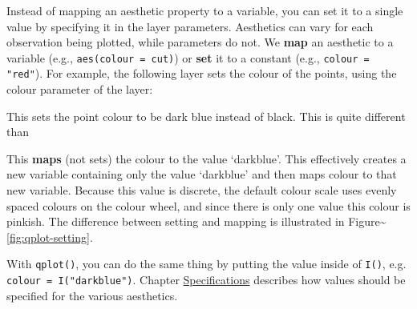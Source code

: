 
Instead of mapping an aesthetic property to a variable, you can set it
to a single value by specifying it in the layer parameters. Aesthetics
can vary for each observation being plotted, while parameters do not. We
\textbf{map} an aesthetic to a variable (e.g.,
\texttt{aes(colour = cut)}) or \textbf{set} it to a constant (e.g.,
\texttt{colour = "red"}). For example, the following layer sets the
colour of the points, using the colour parameter of the layer:

\begin{Shaded}
\begin{Highlighting}[]
\StringTok{ }
\StringTok{ }\NormalTok{(} \NormalTok{) }
\end{Highlighting}
\end{Shaded}

\noindent This sets the point colour to be dark blue instead of black.
This is quite different than

\begin{Shaded}
\begin{Highlighting}[]
\StringTok{ }\NormalTok{(}\NormalTok{(} \NormalTok{))}
\end{Highlighting}
\end{Shaded}

\noindent This \textbf{maps} (not sets) the colour to the value
`darkblue'. This effectively creates a new variable containing only the
value `darkblue' and then maps colour to that new variable. Because this
value is discrete, the default colour scale uses evenly spaced colours
on the colour wheel, and since there is only one value this colour is
pinkish. The difference between setting and mapping is illustrated in
Figure\textasciitilde{}\ref{fig:qplot-setting}.

With \texttt{qplot()}, you can do the same thing by putting the value
inside of \texttt{I()}, e.g. \texttt{colour = I("darkblue")}. Chapter
\hyperref[cha:specifications]{Specifications} describes how values
should be specified for the various aesthetics. 


